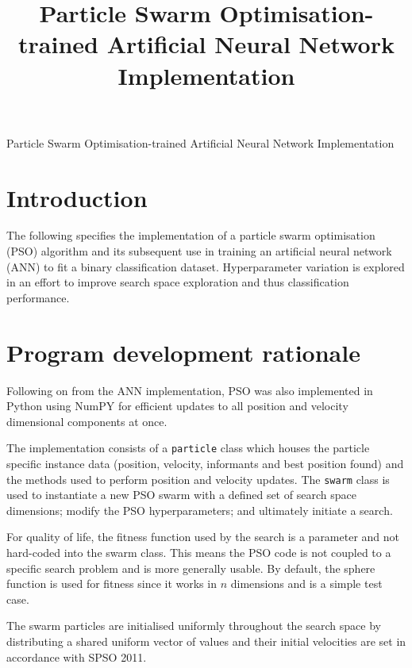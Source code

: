 \documentclass[12pt]{article}
\begin{document}
\title{Particle Swarm Optimisation-trained Artificial Neural Network Implementation}

\begin{center}
  \Large{Particle Swarm Optimisation-trained Artificial Neural Network Implementation}
\end{center}

\vspace{-2em}
\section{Introduction}

The following specifies the implementation of a particle swarm
optimisation (PSO) algorithm and its subsequent use in training an
artificial neural network (ANN) to fit a binary classification dataset.
Hyperparameter variation is explored in an effort to improve search
space exploration and thus classification performance.

\vspace{-1.5em}
\section{Program development rationale}

Following on from the ANN implementation, PSO was also implemented in
Python using NumPY for efficient updates to all position and velocity
dimensional components at once.

The implementation consists of a \texttt{particle} class which houses the
particle specific instance data (position, velocity, informants and best position found) and the
methods used to perform position and velocity updates. The \texttt{swarm}
class is used to instantiate a new PSO swarm with a defined set of search space
dimensions; modify the PSO hyperparameters; and ultimately initiate a search.

For quality of life, the fitness function used by the search is a parameter
and not hard-coded into the swarm class. This means the PSO code is not coupled
to a specific search problem and is more generally usable. By default,
the sphere function is used for fitness since it works in \(n\) dimensions
and is a simple test case.

The swarm particles are initialised uniformly throughout the search space
by distributing a shared uniform vector of values and their initial velocities
are set in accordance with SPSO 2011. \cite{Clerc}
\end{document}

